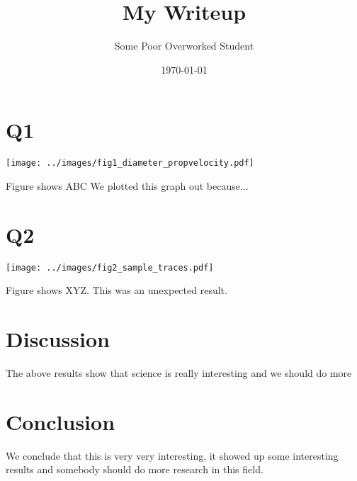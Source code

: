 \documentclass[12pt]{article}
\title{My Writeup}
\author{Some Poor Overworked Student}
\date{\today}
\begin{document}
\maketitle




\section{Q1}

\texttt{[image: ../images/fig1\_diameter\_propvelocity.pdf]}


Figure shows ABC
We plotted this graph out because...


\section{Q2}
\texttt{[image: ../images/fig2\_sample\_traces.pdf]}

Figure shows XYZ. This was an unexpected result.

\section{Discussion}
The above results show that science is really interesting and we should do more


\section{Conclusion}
We conclude that this is very very interesting, it showed up some interesting results and 
somebody should do more research in this field.
\end{document}
